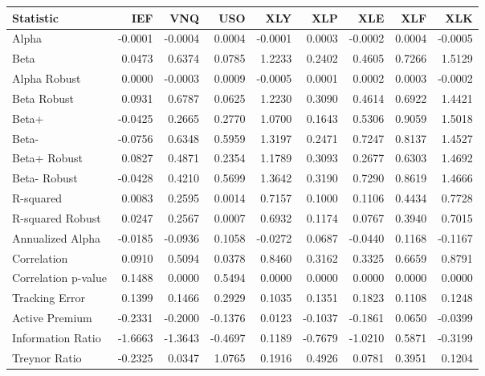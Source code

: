 \begin{tabular}{lrrrrrrrr}
\toprule
Statistic & IEF & VNQ & USO & XLY & XLP & XLE & XLF & XLK \\
\midrule
Alpha & -0.0001 & -0.0004 & 0.0004 & -0.0001 & 0.0003 & -0.0002 & 0.0004 & -0.0005 \\
Beta & 0.0473 & 0.6374 & 0.0785 & 1.2233 & 0.2402 & 0.4605 & 0.7266 & 1.5129 \\
Alpha Robust & 0.0000 & -0.0003 & 0.0009 & -0.0005 & 0.0001 & 0.0002 & 0.0003 & -0.0002 \\
Beta Robust & 0.0931 & 0.6787 & 0.0625 & 1.2230 & 0.3090 & 0.4614 & 0.6922 & 1.4421 \\
Beta+ & -0.0425 & 0.2665 & 0.2770 & 1.0700 & 0.1643 & 0.5306 & 0.9059 & 1.5018 \\
Beta- & -0.0756 & 0.6348 & 0.5959 & 1.3197 & 0.2471 & 0.7247 & 0.8137 & 1.4527 \\
Beta+ Robust & 0.0827 & 0.4871 & 0.2354 & 1.1789 & 0.3093 & 0.2677 & 0.6303 & 1.4692 \\
Beta- Robust & -0.0428 & 0.4210 & 0.5699 & 1.3642 & 0.3190 & 0.7290 & 0.8619 & 1.4666 \\
R-squared & 0.0083 & 0.2595 & 0.0014 & 0.7157 & 0.1000 & 0.1106 & 0.4434 & 0.7728 \\
R-squared Robust & 0.0247 & 0.2567 & 0.0007 & 0.6932 & 0.1174 & 0.0767 & 0.3940 & 0.7015 \\
Annualized Alpha & -0.0185 & -0.0936 & 0.1058 & -0.0272 & 0.0687 & -0.0440 & 0.1168 & -0.1167 \\
Correlation & 0.0910 & 0.5094 & 0.0378 & 0.8460 & 0.3162 & 0.3325 & 0.6659 & 0.8791 \\
Correlation p-value & 0.1488 & 0.0000 & 0.5494 & 0.0000 & 0.0000 & 0.0000 & 0.0000 & 0.0000 \\
Tracking Error & 0.1399 & 0.1466 & 0.2929 & 0.1035 & 0.1351 & 0.1823 & 0.1108 & 0.1248 \\
Active Premium & -0.2331 & -0.2000 & -0.1376 & 0.0123 & -0.1037 & -0.1861 & 0.0650 & -0.0399 \\
Information Ratio & -1.6663 & -1.3643 & -0.4697 & 0.1189 & -0.7679 & -1.0210 & 0.5871 & -0.3199 \\
Treynor Ratio & -0.2325 & 0.0347 & 1.0765 & 0.1916 & 0.4926 & 0.0781 & 0.3951 & 0.1204 \\
\bottomrule
\end{tabular}

